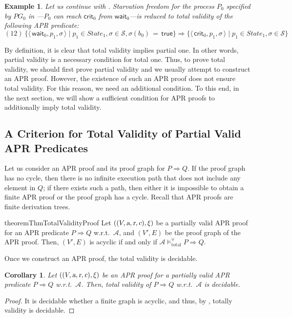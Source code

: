 \documentclass[10pt,a4paper]{article}
\newtheorem{corollary}[theorem]{Corollary}
\newtheorem{example}[theorem]{Example}
\def\cA{\mathcal{A}}
\def\cS{\mathcal{S}}
\newcommand{\symb}[1]{\mathsf{#1}}
\newcommand{\ReachPred}[2]{#1 \Rightarrow #2}
\newcommand{\Valid}[3]{#2 \mathrel{\mathrel{\models^\forall_{\mathrm{#1}}}} #3}
\newcommand{\TotallyValid}[2][\cA]{\Valid{total}{#1}{#2}}
\newcommand{\varsl}[1]{\mbox{\sl #1}}
\newcommand{\State}[1]{\langle\, #1 \,\rangle}
\newcommand{\StateSet}[1]{\mathit{State}_{#1}}
\begin{document}
\begin{example}
	\label{ex:APR-predicate-for-PG0-starvation-freedom}
	Let us continue with .
	Starvation freedom for the process $P_0$ specified by $\mathit{PG}_0$ in ---$P_0$ can reach $\symb{crit}_0$ from $\symb{wait}_0$---is reduced to total validity of the following APR predicate:
	\[
		(12)~
		\ReachPred{\{ \State{\symb{wait}_0,p_1,\sigma} \mid p_1 \in \StateSet{1}, \sigma \in \cS, \sigma(b_0) \,{=}\, \symb{true} \}}{\{ \State{\symb{crit}_0,p_1,\sigma} \mid p_1 \in \StateSet{1}, \sigma \in \cS \}}
	\]
\end{example}

By definition, it is clear that total validity implies partial one.
In other words, partial validity is a necessary condition for total one.
Thus, to prove total validity, we should first prove partial validity and we usually attempt to construct an APR proof.
However, the existence of such an APR proof does not ensure total validity.
For this reason, we need an additional condition.
To this end, in the next section, we will show a sufficient condition for APR proofs to additionally imply total validity.

\subsection{A Criterion for Total Validity of Partial Valid APR Predicates}
\label{subsec:proof-method-for-total-validity}

Let us consider an APR proof and its proof graph for $\ReachPred{P}{Q}$.
If the proof graph has no cycle, then there is no infinite execution path that does not include any element in $Q$;
if there exists such a path, then either it is impossible to obtain a finite APR proof or the proof graph has a cycle.
Recall that APR proofs are finite derivation trees.


\begin{restatable}{theorem}{ThmTotalValidityProof}
	\label{thm:total-validity-proof}
	Let $((V,\varsl{a},\varsl{r},\varsl{c}),\xi)$ be a partially valid APR proof for an APR predicate $\ReachPred{P}{Q}$ w.r.t.\ $\cA$,
	and $(V',E)$ be the proof graph of the APR proof. Then, $(V',E)$ is acyclic
	if and only if
	$\TotallyValid{\ReachPred{P}{Q}}$.
\end{restatable}

Once we construct an APR proof, the total validity is decidable.
\begin{corollary}\label{cor:decidability-of-total-validity-proof}
	Let $((V,\varsl{a},\varsl{r},\varsl{c}),\xi)$ be an APR proof for a partially valid APR predicate $\ReachPred{P}{Q}$ w.r.t.\ $\cA$.
	Then, total validity of $\ReachPred{P}{Q}$ w.r.t.\ $\cA$ is decidable.
\end{corollary}
\begin{proof}
	It is decidable whether a finite graph is acyclic, and thus,
	by , totally validity is decidable.
\end{proof}
\end{document}
